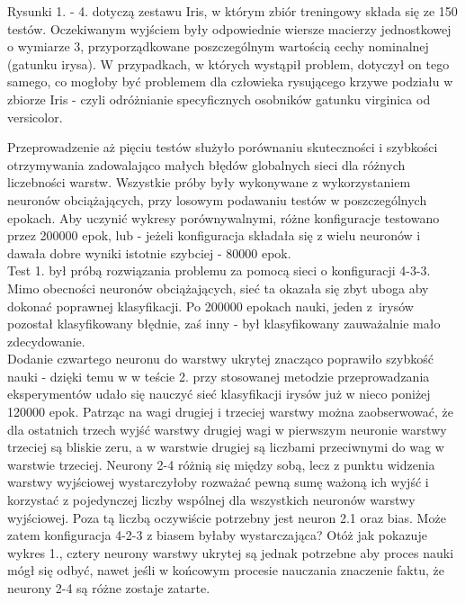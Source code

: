 \documentclass{classrep}
\begin{document}
\clearpage

Rysunki 1. - 4. dotyczą zestawu Iris, w którym zbiór treningowy składa się ze 150 testów.
Oczekiwanym wyjściem były odpowiednie wiersze macierzy jednostkowej o wymiarze 3,
przyporządkowane poszczególnym wartością cechy nominalnej (gatunku irysa).
W przypadkach, w których wystąpił problem, dotyczył on tego samego, co mogłoby być
problemem dla człowieka rysującego krzywe podziału w zbiorze Iris - czyli
odróżnianie specyficznych osobników gatunku virginica od versicolor.

Przeprowadzenie aż pięciu testów
służyło porównaniu skuteczności i szybkości otrzymywania zadowalająco
małych błędów globalnych sieci dla różnych liczebności warstw. Wszystkie próby
były wykonywane z wykorzystaniem neuronów obciążających, przy losowym podawaniu
testów w poszczególnych epokach. Aby uczynić wykresy porównywalnymi, różne konfiguracje
testowano przez 200000 epok, lub - jeżeli konfiguracja składała się z wielu neuronów
i dawała dobre wyniki istotnie szybciej - 80000 epok. \\

Test 1. był próbą rozwiązania problemu za pomocą sieci o konfiguracji 4-3-3. Mimo
obecności neuronów obciążających, sieć ta okazała się zbyt uboga aby dokonać poprawnej
klasyfikacji. Po 200000 epokach nauki, jeden z~irysów pozostał klasyfikowany błędnie,
zaś inny - był klasyfikowany zauważalnie mało zdecydowanie. \\

Dodanie czwartego neuronu do warstwy ukrytej znacząco poprawiło szybkość nauki - dzięki
temu w w teście 2. przy stosowanej metodzie przeprowadzania eksperymentów udało się nauczyć sieć
klasyfikacji irysów już w nieco poniżej 120000 epok. Patrząc na wagi drugiej
i trzeciej warstwy można zaobserwować, że dla ostatnich trzech wyjść warstwy drugiej
wagi w pierwszym neuronie warstwy trzeciej są bliskie zeru, a w warstwie drugiej są liczbami
przeciwnymi do wag w warstwie trzeciej.
Neurony 2-4 różnią się między sobą, lecz z punktu widzenia warstwy wyjściowej wystarczyłoby rozważać pewną
sumę ważoną ich wyjść i korzystać z pojedynczej liczby wspólnej dla wszystkich neuronów warstwy wyjściowej.
Poza tą liczbą oczywiście potrzebny jest neuron 2.1 oraz bias. Może
zatem konfiguracja 4-2-3 z biasem byłaby wystarczająca? Otóż jak pokazuje wykres 1., cztery neurony
warstwy ukrytej są jednak potrzebne aby proces nauki mógł się odbyć, nawet jeśli
w końcowym procesie nauczania znaczenie faktu, że neurony 2-4 są różne zostaje zatarte. \\
\end{document}
